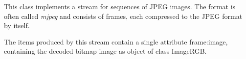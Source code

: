 \label{sec:stream.io.MjpegImageStream}

This class implements a stream for sequences of JPEG images. The format is often
called {\em mjpeg} and consists of frames, each compressed to the JPEG format by
itself.


The items produced by this stream contain a single attribute {\ttfamily frame:image},
containing the decoded bitmap image as object of class {\ttfamily ImageRGB}.